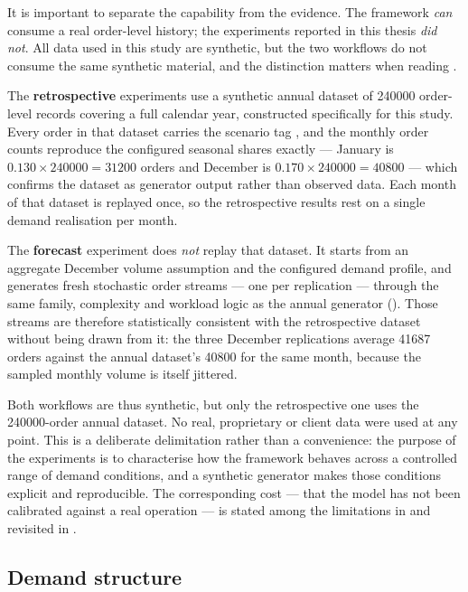 It is important to separate the capability from the evidence. The framework \emph{can} consume
a real order-level history; the experiments reported in this thesis \emph{did not}. All data
used in this study are synthetic, but the two workflows do not consume the same synthetic
material, and the distinction matters when reading .

The \textbf{retrospective} experiments use a synthetic annual dataset of \num{240000}
order-level records covering a full calendar year, constructed specifically for this study.
Every order in that dataset carries the scenario tag , and the monthly
order counts reproduce the configured seasonal shares exactly --- January is
\(0.130 \times \num{240000} = \num{31200}\) orders and December is
\(0.170 \times \num{240000} = \num{40800}\) --- which confirms the dataset as generator output
rather than observed data. Each month of that dataset is replayed once, so the retrospective
results rest on a single demand realisation per month.

The \textbf{forecast} experiment does \emph{not} replay that dataset. It starts from an
aggregate December volume assumption and the configured demand profile, and generates fresh
stochastic order streams --- one per replication --- through the same family, complexity and
workload logic as the annual generator (). Those streams are
therefore statistically consistent with the retrospective dataset without being drawn from it:
the three December replications average \num{41687} orders against the annual dataset's
\num{40800} for the same month, because the sampled monthly volume is itself jittered.

Both workflows are thus synthetic, but only the retrospective one uses the \num{240000}-order
annual dataset. No real, proprietary or client data were used at any point. This is a deliberate delimitation
rather than a convenience: the purpose of the experiments is to characterise how the framework
behaves across a controlled range of demand conditions, and a synthetic generator makes those
conditions explicit and reproducible. The corresponding cost --- that the model has not been
calibrated against a real operation --- is stated among the limitations in
 and revisited in .

\subsection{Demand structure}

